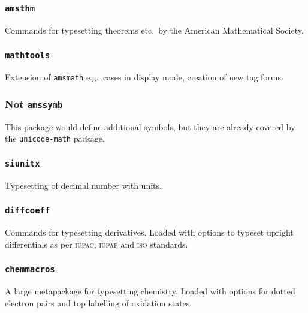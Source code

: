 \documentclass{article}
\begin{document}
\subsubsection{\texttt{amsthm}}
Commands for typesetting theorems etc.\ by the American Mathematical Society.
\subsubsection{\texttt{mathtools}}
Extension of \texttt{amsmath} e.g.\ cases in display mode, creation of new tag forms.
\subsubsection{Not \texttt{amssymb}}
This package would define additional symbols, but they are already covered by the \texttt{unicode-math} package.
\subsubsection{\texttt{siunitx}}
Typesetting of decimal number with units.
\subsubsection{\texttt{diffcoeff}}
Commands for typesetting derivatives. Loaded with options to typeset upright differentials as per \textsc{iupac}, \textsc{iupap} and \textsc{iso} standards.
\subsubsection{\texttt{chemmacros}}
A large metapackage for typesetting chemistry, Loaded with options for dotted electron pairs and top labelling of oxidation states.
\end{document}
